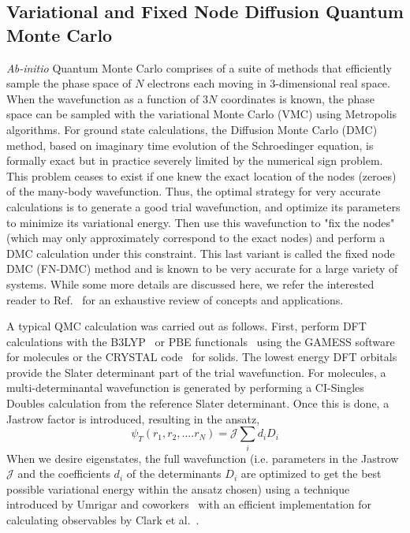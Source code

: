 \documentclass[aip,jcp,twocolumn,10pt]{revtex4-1}
\begin{document}
\subsection{Variational and Fixed Node Diffusion Quantum Monte Carlo}
\emph{Ab-initio} Quantum Monte Carlo comprises of a suite of methods that efficiently sample 
the phase space of $N$ electrons each moving in 3-dimensional real space. 
When the wavefunction as a function of $3N$ coordinates is known, the phase space
can be sampled with the variational Monte Carlo (VMC) using Metropolis algorithms.
For ground state calculations, the Diffusion Monte Carlo (DMC) method, 
based on imaginary time evolution of the Schroedinger equation, is formally exact but in practice severely 
limited by the numerical sign problem. This problem ceases to exist if one knew the exact location 
of the nodes (zeroes) of the many-body wavefunction. Thus, the optimal 
strategy for very accurate calculations is 
to generate a good trial wavefunction, and optimize its parameters to 
minimize its variational energy. Then use this wavefunction to "fix the nodes" (which may 
only approximately correspond to the exact nodes) and perform a DMC calculation under this constraint.  
This last variant is called the fixed node DMC (FN-DMC) method and is known to be 
very accurate for a large variety of systems. While some more details are discussed here, 
we refer the interested reader to Ref.~\cite{Foulkes_review} for an exhaustive 
review of concepts and applications.

A typical QMC calculation was carried out as follows. 
First, perform DFT calculations with the B3LYP~\cite{B3LYP} or 
PBE functionals~\cite{PBE} using the GAMESS software~\cite{GAMESS} 
for molecules or the CRYSTAL code~\cite{CRYSTAL} for solids.  
The lowest energy DFT orbitals provide the Slater determinant part of the trial 
wavefunction. For molecules, a multi-determinantal wavefunction is generated by performing 
a CI-Singles Doubles calculation from the reference Slater determinant. 
Once this is done, a Jastrow factor is introduced, resulting in the ansatz,
\begin{equation}
	\psi_T (r_1,r_2,....r_N) = \mathcal{J} \sum_{i} d_i D_i
\end{equation} 
When we desire eigenstates, the full wavefunction 
(i.e. parameters in the Jastrow $\mathcal{J}$ 
and the coefficients $d_i$ of the determinants $D_i$ 
are optimized to get the best possible variational energy within the ansatz chosen) 
using a technique introduced by Umrigar and coworkers~\cite{Umrigar_optimization} 
with an efficient implementation for calculating observables 
by Clark et al.~\cite{Clark_multidet}.
\end{document}
